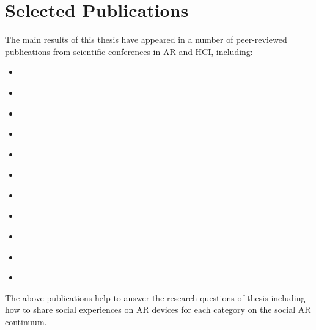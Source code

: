 \section{Selected Publications}

The main results of this thesis have appeared in a number of peer-reviewed publications from scientific conferences in AR and HCI, including: 

\begin{itemize}
    \item{ }
    \item{ }
    \item{ }
    \item{ }    
    \item{ }
    \item{ }
    \item{ }
    \item{ }
    \item{ }
    \item{ }
    \item{ }
\end{itemize}

The above publications help to answer the research questions of thesis including how to share social experiences on AR devices for each category on the social AR continuum. 


